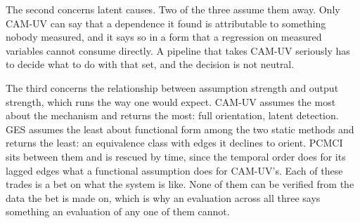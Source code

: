 The second concerns latent causes. Two of the three assume them away. Only CAM-UV can say that a dependence it found is attributable to something nobody measured, and it says so in a form that a regression on measured variables cannot consume directly. A pipeline that takes CAM-UV seriously has to decide what to do with that set, and the decision is not neutral.

The third concerns the relationship between assumption strength and output strength, which runs the way one would expect. CAM-UV assumes the most about the mechanism and returns the most: full orientation, latent detection. GES assumes the least about functional form among the two static methods and returns the least: an equivalence class with edges it declines to orient. PCMCI sits between them and is rescued by time, since the temporal order does for its lagged edges what a functional assumption does for CAM-UV's. Each of these trades is a bet on what the system is like. None of them can be verified from the data the bet is made on, which is why an evaluation across all three says something an evaluation of any one of them cannot.
